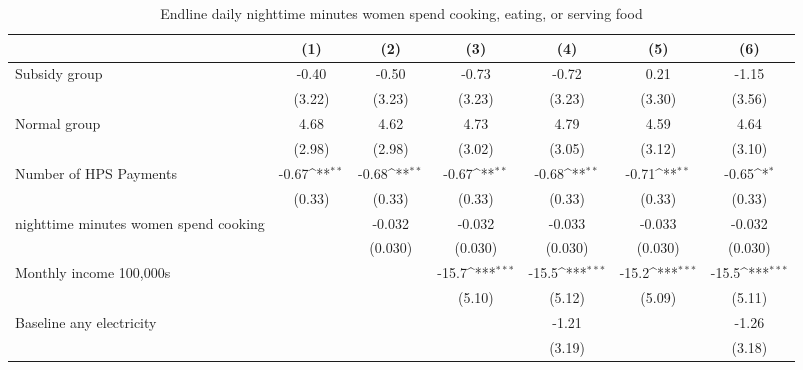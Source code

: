 \begin{table}[htbp]\centering
\def\sym#1{\ifmmode^{#1}\else\(^{#1}\)\fi}
\caption{Endline daily nighttime minutes women spend cooking, eating, or serving food}
\begin{tabular*}{1\hsize}{@{\hskip\tabcolsep\extracolsep\fill}l*{6}{c}}
\toprule
                &\multicolumn{1}{c}{(1)}         &\multicolumn{1}{c}{(2)}         &\multicolumn{1}{c}{(3)}         &\multicolumn{1}{c}{(4)}         &\multicolumn{1}{c}{(5)}         &\multicolumn{1}{c}{(6)}         \\
\midrule
Subsidy group   &    -0.40         &    -0.50         &    -0.73         &    -0.72         &     0.21         &    -1.15         \\
                &   (3.22)         &   (3.23)         &   (3.23)         &   (3.23)         &   (3.30)         &   (3.56)         \\
Normal group    &     4.68         &     4.62         &     4.73         &     4.79         &     4.59         &     4.64         \\
                &   (2.98)         &   (2.98)         &   (3.02)         &   (3.05)         &   (3.12)         &   (3.10)         \\
Number of HPS Payments&    -0.67\sym{**} &    -0.68\sym{**} &    -0.67\sym{**} &    -0.68\sym{**} &    -0.71\sym{**} &    -0.65\sym{*}  \\
                &   (0.33)         &   (0.33)         &   (0.33)         &   (0.33)         &   (0.33)         &   (0.33)         \\
nighttime minutes women spend cooking&                  &   -0.032         &   -0.032         &   -0.033         &   -0.033         &   -0.032         \\
                &                  &  (0.030)         &  (0.030)         &  (0.030)         &  (0.030)         &  (0.030)         \\
Monthly income 100,000s&                  &                  &    -15.7\sym{***}&    -15.5\sym{***}&    -15.2\sym{***}&    -15.5\sym{***}\\
                &                  &                  &   (5.10)         &   (5.12)         &   (5.09)         &   (5.11)         \\
Baseline any electricity&                  &                  &                  &    -1.21         &                  &    -1.26         \\
                &                  &                  &                  &   (3.19)         &                  &   (3.18)         \\

\end{tabular*}
\end{table}
